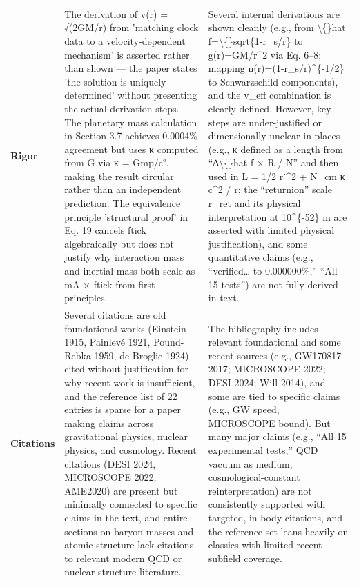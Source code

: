 \documentclass[11pt]{article}
\begin{document}
\begin{longtable}{@{} p{2.2cm} p{6.3cm} p{6.3cm} @{}}
\rowcolor{rowgray}
\textbf{Rigor} &
The derivation of v(r) = √(2GM/r) from 'matching clock data to a velocity-dependent mechanism' is asserted rather than shown — the paper states 'the solution is uniquely determined' without presenting the actual derivation steps. The planetary mass calculation in Section 3.7 achieves 0.0004\% agreement but uses κ computed from G via κ = Gmp/c², making the result circular rather than an independent prediction. The equivalence principle 'structural proof' in Eq. 19 cancels ftick algebraically but does not justify why interaction mass and inertial mass both scale as mA × ftick from first principles. &
Several internal derivations are shown cleanly (e.g., from \textbackslash\{\}hat f=\textbackslash\{\}sqrt\{1-r\_s/r\} to g(r)=GM/r\textasciicircum{}2 via Eq. 6–8; mapping n(r)=(1-r\_s/r)\textasciicircum{}\{-1/2\} to Schwarzschild components), and the v\_eff combination is clearly defined. However, key steps are under-justified or dimensionally unclear in places (e.g., κ defined as a length from “∆\textbackslash\{\}hat f × R / N” and then used in L = 1/2 r˙\textasciicircum{}2 + N\_cm κ c\textasciicircum{}2 / r; the “returnion” scale r\_ret and its physical interpretation at 10\textasciicircum{}\{-52\} m are asserted with limited physical justification), and some quantitative claims (e.g., “verified… to 0.000000\%,” “All 15 tests”) are not fully derived in-text. \\[6pt]

\textbf{Citations} &
Several citations are old foundational works (Einstein 1915, Painlevé 1921, Pound-Rebka 1959, de Broglie 1924) cited without justification for why recent work is insufficient, and the reference list of 22 entries is sparse for a paper making claims across gravitational physics, nuclear physics, and cosmology. Recent citations (DESI 2024, MICROSCOPE 2022, AME2020) are present but minimally connected to specific claims in the text, and entire sections on baryon masses and atomic structure lack citations to relevant modern QCD or nuclear structure literature. &
The bibliography includes relevant foundational and some recent sources (e.g., GW170817 2017; MICROSCOPE 2022; DESI 2024; Will 2014), and some are tied to specific claims (e.g., GW speed, MICROSCOPE bound). But many major claims (e.g., “All 15 experimental tests,” QCD vacuum as medium, cosmological-constant reinterpretation) are not consistently supported with targeted, in-body citations, and the reference set leans heavily on classics with limited recent subfield coverage. \\

\end{longtable}
\end{document}
